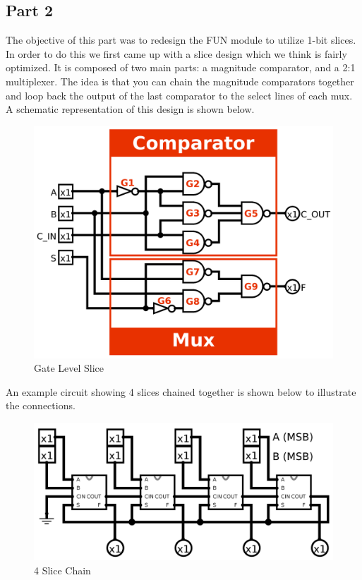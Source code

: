 \documentclass{article}
\begin{document}
\newpage
\subsection*{Part 2}

The objective of this part was to redesign the FUN module to utilize 1-bit
slices. In order to do this we first came up with a slice design which we think
is fairly optimized. It is composed of two main parts: a magnitude comparator,
and a 2:1 multiplexer. The idea is that you can chain the magnitude comparators
together and loop back the output of the last comparator to the select lines of
each mux. A schematic representation of this design is shown below.

\begin{figure}[H]
    \centering
    \includegraphics[width=0.75\linewidth]{../logisim/logisim_bitslice_gates_labeled.png}
    \caption{Gate Level Slice}
\end{figure}

An example circuit showing 4 slices chained together is shown below to
illustrate the connections.

\begin{figure}[H]
    \centering
    \includegraphics[width=0.75\linewidth]{../logisim/logisim_main.png}
    \caption{4 Slice Chain}
\end{figure}
\end{document}
